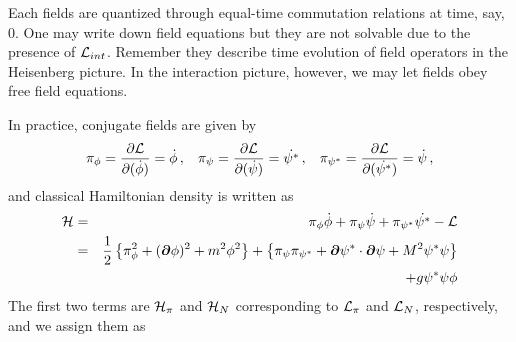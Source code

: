 Each fields are quantized through equal-time commutation relations at time,
say, 0. One may write down field equations but they are not solvable due to
the presence of ${\cal L}_{int}$. Remember they describe time evolution of
field operators in the Heisenberg picture. In the interaction picture, however,
we may let fields obey free field equations. 
\begin{comment}
Field equations read
\begin{eqnarray}
\begin{array}{l}
(\Box + m^2) \phi = - g\psi^* \psi\,,
\vspace{2mm}
\\
(\Box + M^2) \psi = -g\psi \phi\,,
\vspace{2mm}
\\
(\Box + M^2) \psi^* = -g\psi^* \phi
\end{array}
\end{eqnarray}
\end{comment}
In practice, 
conjugate fields are given by
\begin{eqnarray}
\pi_\phi = \frac{\partial {\cal L}}{\partial(\dot{\phi})} = \dot{\phi}
\,,\hspace{3mm}
\pi_\psi = \frac{\partial {\cal L}}{\partial(\dot{\psi})} = \dot{\psi^*}
\,,\hspace{3mm}
\pi_{\psi^*} = \frac{\partial {\cal L}}{\partial(\dot{\psi^*})} = \dot{\psi}
\,,
\end{eqnarray}
and classical Hamiltonian density is written as
\begin{eqnarray}
{\cal H} 
&=&
\pi_\phi \dot{\phi} +\pi_\psi \dot{\psi} + \pi_{\psi^*} \dot{\psi^*} - {\cal L}
\nonumber\\
&=&
\frac{1}{2} \left\{
\pi_\phi^2 + (\mbox{\boldmath $\partial$}\phi)^2 + m^2 \phi^2
\right\}
+
\left\{
\pi_\psi \pi_{\psi^*}
+ \mbox{\boldmath $\partial$} \psi^* \cdot \mbox{\boldmath $\partial$} \psi
+ M^2 \psi^* \psi \right\}
\nonumber\\
&&+ g \psi^* \psi \phi
\label{eqn:sclYkwHamDens}
\end{eqnarray} 
The first two terms are ${\cal H}_\pi$ and ${\cal H}_N$ corresponding to
${\cal L}_\pi$ and ${\cal L}_N$, respectively, and we assign them  as
